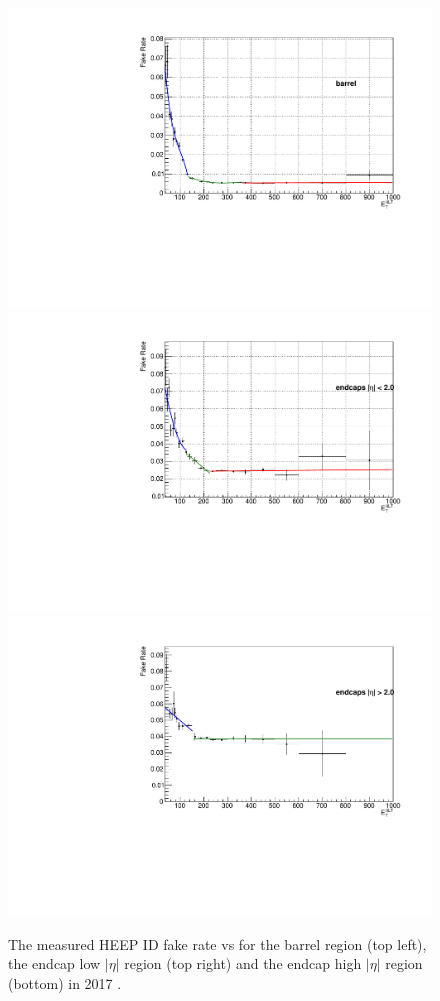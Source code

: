 \begin{figure}[b]
  \begin{center}
\includegraphics[width=0.47\linewidth,angle=0]{figures/Zprime/2017/fakeRates/FakeRate_Barrel.pdf}
\includegraphics[width=0.47\linewidth,angle=0]{figures/Zprime/2017/fakeRates/EndCap_Eta_less2.pdf}
\includegraphics[width=0.47\linewidth,angle=0]{figures/Zprime/2017/fakeRates/Ext_Endcap.pdf}
    \caption{The measured HEEP ID fake rate vs \et for the barrel region (top left), the endcap low $|\eta|$ region (top right) and the endcap high $|\eta|$ region (bottom) in 2017 \cite{CMS-AN-2018-021}.}
       \label{fr:fig:heepFRV70VsEt_2017}
  \end{center}
\end{figure}

